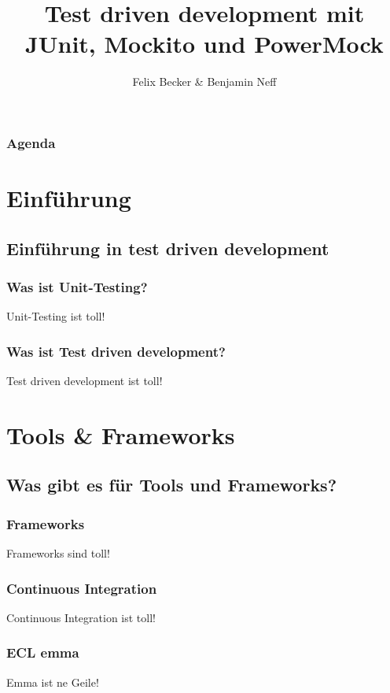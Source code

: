 \documentclass{beamer}
\title{Test driven development mit JUnit, Mockito und PowerMock}
\institute{Computerseminar Tondorf 2011}
\author[F. Becker, B. Neff]{
        Felix Becker \& 
	Benjamin Neff
}
\begin{document}
	\begin{frame}
		\titlepage
	\end{frame}

	\begin{frame}
		\frametitle{Agenda}
		\setcounter{tocdepth}{1}
		\tableofcontents
	\end{frame}
	

	\section{Einführung}
	
		\subsection{Einführung in test driven development}

			\begin{frame}
				\frametitle{Was ist Unit-Testing?}
				Unit-Testing ist toll!
			\end{frame}

			\begin{frame}
				\frametitle{Was ist Test driven development?}
				Test driven development ist toll!
			\end{frame}

	
	\section{Tools \& Frameworks}

		\subsection{Was gibt es für Tools und Frameworks?}

			\begin{frame}
				\frametitle{Frameworks}
				Frameworks sind toll!
			\end{frame}

			\begin{frame}
				\frametitle{Continuous Integration}
				Continuous Integration ist toll!
			\end{frame}

			\begin{frame}
				\frametitle{ECL emma}
				Emma ist ne Geile!
			\end{frame}

	
\end{document}
